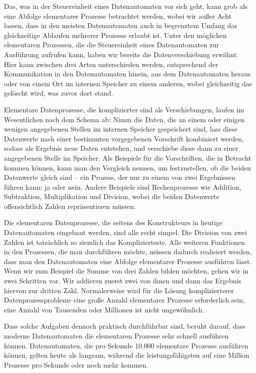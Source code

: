 {Das, was in der Steuereinheit eines Datenautomaten vor sich geht, kann grob als eine Abfolge elementarer Prozesse betrachtet werden, wobei wir außer Acht lassen, dass in den meisten Datenautomaten auch in begrenztem Umfang das gleichzeitige Ablaufen mehrerer Prozesse erlaubt ist. Unter den möglichen elementaren Prozessen, die die Steuereinheit eines Datenautomaten zur Ausführung aufrufen kann, haben wir bereits die Datenverschiebung erwähnt. Hier kann zwischen drei Arten unterschieden werden, entsprechend der Kommunikation in den Datenautomaten hinein, aus dem Datenautomaten heraus oder von einem Ort im internen Speicher zu einem anderen, wobei gleichzeitig das gelöscht wird, was zuvor dort stand.

Elementare Datenprozesse, die komplizierter sind als Verschiebungen, laufen im Wesentlichen nach dem Schema ab: Nimm die Daten, die an einem oder einigen wenigen angegebenen Stellen im internen Speicher gespeichert sind, lass diese Datenwerte nach einer bestimmten vorgegebenen Vorschrift kombiniert werden, sodass als Ergebnis neue Daten entstehen, und verschiebe diese dann zu einer angegebenen Stelle im Speicher. Als Beispiele für die Vorschriften, die in Betracht kommen können, kann man den Vergleich nennen, um festzustellen, ob die beiden Datenwerte gleich sind – ein Prozess, der nur zu einem von zwei Ergebnissen führen kann: ja oder nein. Andere Beispiele sind Rechenprozesse wie Addition, Subtraktion, Multiplikation und Division, wobei die beiden Datenwerte offensichtlich Zahlen repräsentieren müssen.

Die elementaren Datenprozesse, die seitens des Konstrukteurs in heutige Datenautomaten eingebaut werden, sind alle recht simpel. Die Division von zwei Zahlen ist tatsächlich so ziemlich das Komplizierteste. Alle weiteren Funktionen in den Prozessen, die man durchführen möchte, müssen dadurch realisiert werden, dass man den Datenautomaten eine Abfolge elementarer Prozesse ausführen lässt. Wenn wir zum Beispiel die Summe von drei Zahlen bilden möchten, gehen wir in zwei Schritten vor. Wir addieren zuerst zwei von ihnen und dann das Ergebnis hiervon zur dritten Zahl. Normalerweise wird für die Lösung komplizierterer Datenprozessprobleme eine große Anzahl elementarer Prozesse erforderlich sein, eine Anzahl von Tausenden oder Millionen ist nicht ungewöhnlich.

Dass solche Aufgaben dennoch praktisch durchführbar sind, beruht darauf, dass moderne Datenautomaten die elementaren Prozesse sehr schnell ausführen können. Datenautomaten, die pro Sekunde 10.000 elementare Prozesse ausführen können, gelten heute als langsam, während die leistungsfähigsten auf eine Million Prozesse pro Sekunde oder noch mehr kommen.

}
